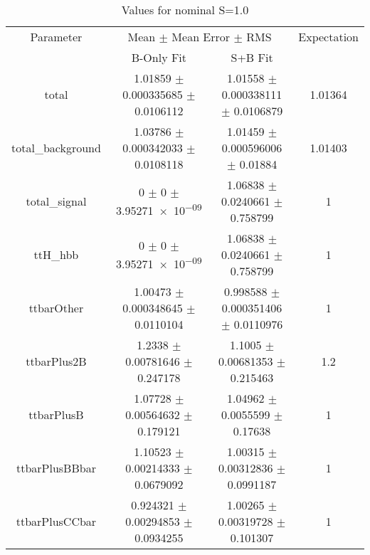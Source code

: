 \begin{table}
\centering
\caption{Values for nominal S=1.0}
\begin{tabular}{cccc}
\toprule
Parameter & \multicolumn{2}{c}{Mean $\pm$ Mean Error $\pm$ RMS} & Expectation\\
 & B-Only Fit & S+B Fit & \\
\midrule
total & \num{1.01859} $\pm$ \num{0.000335685} $\pm$ \num{0.0106112} & \num{1.01558} $\pm$ \num{0.000338111} $\pm$ \num{0.0106879} & \num{1.01364}\\
total\_background & \num{1.03786} $\pm$ \num{0.000342033} $\pm$ \num{0.0108118} & \num{1.01459} $\pm$ \num{0.000596006} $\pm$ \num{0.01884} & \num{1.01403}\\
total\_signal & \num{0} $\pm$ \num{0} $\pm$ \num{3.95271e-09} & \num{1.06838} $\pm$ \num{0.0240661} $\pm$ \num{0.758799} & \num{1}\\
ttH\_hbb & \num{0} $\pm$ \num{0} $\pm$ \num{3.95271e-09} & \num{1.06838} $\pm$ \num{0.0240661} $\pm$ \num{0.758799} & \num{1}\\
ttbarOther & \num{1.00473} $\pm$ \num{0.000348645} $\pm$ \num{0.0110104} & \num{0.998588} $\pm$ \num{0.000351406} $\pm$ \num{0.0110976} & \num{1}\\
ttbarPlus2B & \num{1.2338} $\pm$ \num{0.00781646} $\pm$ \num{0.247178} & \num{1.1005} $\pm$ \num{0.00681353} $\pm$ \num{0.215463} & \num{1.2}\\
ttbarPlusB & \num{1.07728} $\pm$ \num{0.00564632} $\pm$ \num{0.179121} & \num{1.04962} $\pm$ \num{0.0055599} $\pm$ \num{0.17638} & \num{1}\\
ttbarPlusBBbar & \num{1.10523} $\pm$ \num{0.00214333} $\pm$ \num{0.0679092} & \num{1.00315} $\pm$ \num{0.00312836} $\pm$ \num{0.0991187} & \num{1}\\
ttbarPlusCCbar & \num{0.924321} $\pm$ \num{0.00294853} $\pm$ \num{0.0934255} & \num{1.00265} $\pm$ \num{0.00319728} $\pm$ \num{0.101307} & \num{1}\\
\bottomrule
\end{tabular}
\end{table}